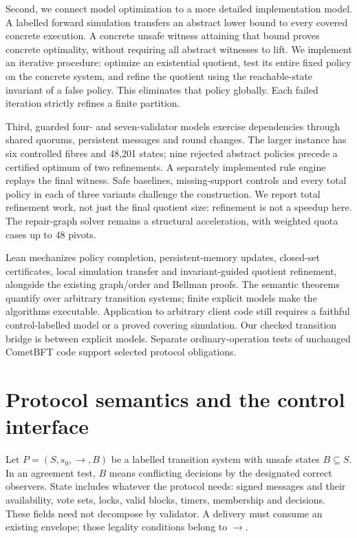 Second, we connect model optimization to a more detailed implementation
model. A labelled forward simulation transfers an abstract lower bound
to every covered concrete execution. A concrete unsafe witness attaining
that bound proves concrete optimality, without requiring all abstract
witnesses to lift. We implement an iterative procedure: optimize an
existential quotient, test its entire fixed policy on the concrete
system, and refine the quotient using the reachable-state invariant of a
false policy. This eliminates that policy globally. Each failed
iteration strictly refines a finite partition.

Third, guarded four- and seven-validator models exercise dependencies
through shared quorums, persistent messages and round changes. The
larger instance has six controlled fibres and 48,201 states; nine
rejected abstract policies precede a certified optimum of two
refinements. A separately implemented rule engine replays the final
witness. Safe baselines, missing-support controls and every total policy
in each of three variants challenge the construction. We report total
refinement work, not just the final quotient size: refinement is not a
speedup here. The repair-graph solver remains a structural acceleration,
with weighted quota cases up to 48 pivots.

Lean mechanizes policy completion, persistent-memory updates, closed-set
certificates, local simulation transfer and invariant-guided quotient
refinement, alongside the existing graph/order and Bellman proofs. The
semantic theorems quantify over arbitrary transition systems; finite
explicit models make the algorithms executable. Application to arbitrary
client code still requires a faithful control-labelled model or a proved
covering simulation. Our checked transition bridge is between explicit
models. Separate ordinary-operation tests of unchanged CometBFT code
support selected protocol obligations.

\section{Protocol semantics and the control
interface}\label{protocol-semantics-and-the-control-interface}

Let \(P=(S,s_0,\to,B)\) be a labelled transition system with unsafe
states \(B\subseteq S\). In an agreement test, \(B\) means conflicting
decisions by the designated correct observers. State includes whatever
the protocol needs: signed messages and their availability, vote sets,
locks, valid blocks, timers, membership and decisions. These fields need
not decompose by validator. A delivery must consume an existing
envelope; those legality conditions belong to \(\to\).

